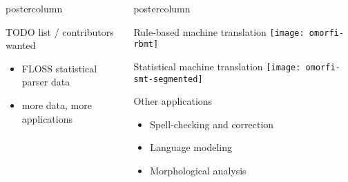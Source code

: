 \documentclass[final,hyperref={pdfpagelabels}]{beamer}
\newlength{\columnheight}
\begin{document}
\begin{frame}
\begin{columns}
\begin{column}{.49\textwidth}
\begin{beamercolorbox}[center,wd=\textwidth]{postercolumn}
\begin{minipage}[T]{.95\textwidth}
{        \begin{block}{TODO list / contributors wanted}
            \begin{itemize}
                \item FLOSS statistical parser data
                \item more data, more applications
            \end{itemize}
        \end{block}

         }
        \end{minipage}
      \end{beamercolorbox}
  \end{column}

   \begin{column}{.49\textwidth}
      \begin{beamercolorbox}[center,wd=\textwidth]{postercolumn}
        \begin{minipage}[T]{.95\textwidth} %
          \parbox[t][\columnheight]{\textwidth}{ %

        \begin{block}{Rule-based machine translation}
            \texttt{[image: omorfi-rbmt]}
        \end{block}

        \begin{block}{Statistical machine translation}
            \texttt{[image: omorfi-smt-segmented]}
        \end{block}

        \begin{block}{Other applications}
            \begin{itemize}
                \item Spell-checking and correction
                \item Language modeling
                \item Morphological analysis
            \end{itemize}
        \end{block}

}
\end{minipage}
\end{beamercolorbox}
\end{column}
\end{columns}
\end{frame}
\end{document}
